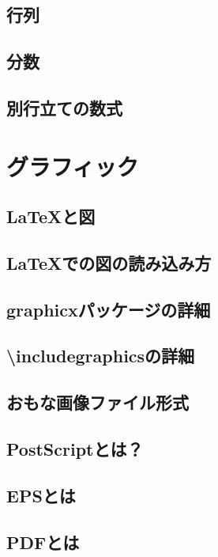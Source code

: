\documentclass{jsbook}
\begin{document}
\section{行列}

\section{分数}

\section{別行立ての数式}

\chapter{グラフィック}

\section{\LaTeX と図}

\section{\LaTeX での図の読み込み方}

\section{graphicxパッケージの詳細}

\section{\textbackslash includegraphicsの詳細}

\section{おもな画像ファイル形式}

\section{PostScriptとは？}

\section{EPSとは}

\section{PDFとは}
\end{document}
